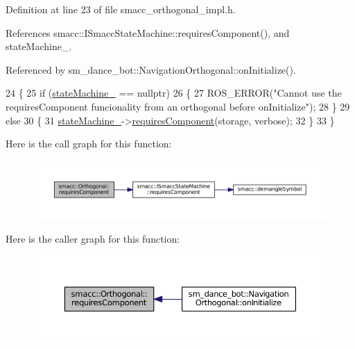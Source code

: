 Definition at line 23 of file smacc\+\_\+orthogonal\+\_\+impl.\+h.



References smacc\+::\+I\+Smacc\+State\+Machine\+::requires\+Component(), and state\+Machine\+\_\+.



Referenced by sm\+\_\+dance\+\_\+bot\+::\+Navigation\+Orthogonal\+::on\+Initialize().


\begin{DoxyCode}
24 \{
25     \textcolor{keywordflow}{if} (\hyperlink{classsmacc_1_1Orthogonal_acea2058ac94667e46fc60ed3d4f524f7}{stateMachine\_} == \textcolor{keyword}{nullptr})
26     \{
27         ROS\_ERROR(\textcolor{stringliteral}{"Cannot use the requiresComponent funcionality from an orthogonal before onInitialize"});
28     \}
29     \textcolor{keywordflow}{else}
30     \{
31         \hyperlink{classsmacc_1_1Orthogonal_acea2058ac94667e46fc60ed3d4f524f7}{stateMachine\_}->\hyperlink{classsmacc_1_1ISmaccStateMachine_a729d0bcb3c4894e33f0696e0b1aeb155}{requiresComponent}(storage, verbose);
32     \}
33 \}
\end{DoxyCode}


Here is the call graph for this function\+:
\nopagebreak
\begin{figure}[H]
\begin{center}
\leavevmode
\includegraphics[width=350pt]{classsmacc_1_1Orthogonal_a098b5be0f89d0911afc44c10b756ef2a_cgraph}
\end{center}
\end{figure}




Here is the caller graph for this function\+:
\nopagebreak
\begin{figure}[H]
\begin{center}
\leavevmode
\includegraphics[width=350pt]{classsmacc_1_1Orthogonal_a098b5be0f89d0911afc44c10b756ef2a_icgraph}
\end{center}
\end{figure}


